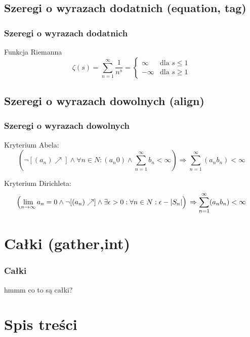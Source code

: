 \documentclass{beamer}
\begin{document}
\subsection{Szeregi o wyrazach dodatnich (equation, tag)}

\begin{frame}
	\frametitle{Szeregi o wyrazach dodatnich}
	\begin{block}{Funkcja Riemanna}
		$$
			\zeta (s) = \sum_{n=1}^\infty \frac{1}{n^s} = 
				\begin{cases}
					\infty & \text{dla } s \leq 1 \\
					-\infty & \text{dla } s \ge 1
				\end{cases}
		$$
	\end{block}

\end{frame}

\subsection{Szeregi o wyrazach dowolnych (align)}

\begin{frame}
	\frametitle{Szeregi o wyrazach dowolnych}
	\begin{block}{Kryterium Abela:}
		$$
		\left(\lnot [(a_n) \nearrow] \land \forall{n \in N} : (a_n 0) \land \sum_{n=1}^\infty b_n < \infty \right) \Rightarrow \sum_{n=1}^\infty (a_n b_n) < \infty
		$$
	\end{block}


	\begin{block}{Kryterium Dirichleta:}
		$$
		\left(\lim_{n \to \infty} a_n = 0 \land \lnot [(a_n) \nearrow] \land \exists{\epsilon > 0} : \forall{n \in N} : \epsilon - |S_n| \right) \\
		\hfill \Rightarrow \displaystyle \sum_{n=1}^\infty (a_n b_n) < \infty
		$$
	\end{block}
\end{frame}


\section{Całki (gather,int)}

\begin{frame}
	\frametitle{Całki}
	hmmm co to są całki?
\end{frame}


\section{Spis treści}

\begin{frame}
	\tableofcontents
\end{frame}
\end{document}
